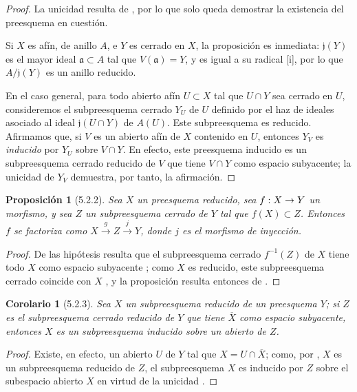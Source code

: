 \documentclass[oneside]{amsart}
\theoremstyle{ega-env-style}
\theoremstyle{ega-thm-env-style}
\newtheorem*{proposition}{Proposición}
\newtheorem*{corollary}{Corolario}
\theoremstyle{ega-defn-env-style}
\renewcommand{\to}{\mathchoice{\longrightarrow}{\rightarrow}{\rightarrow}{\rightarrow}}
\newcommand{\oldpage}[2][]{{\marginnote{\normalfont{\textbf{#1}~|~#2}}}\ignorespaces}
\let\EGAOriginalLabel\label
\renewcommand{\label}[1]{\phantomsection\EGAOriginalLabel{#1}}
\begin{document}
\begin{proof}
La unicidad resulta de , por lo que solo queda demostrar la existencia del preesquema en cuestión.

Si $X$ es afín, de anillo $A$, e $Y$ es cerrado en $X$, la proposición es inmediata:
$\mathfrak{j}(Y)$ es el mayor ideal $\mathfrak{a}\subset A$ tal que $V(\mathfrak{a})=Y$, y es igual a su radical [i], por lo que $A/\mathfrak{j}(Y)$ es un anillo reducido.

En el caso general, para todo abierto afín $U\subset X$ tal que $U\cap Y$ sea cerrado en $U$, consideremos el subpreesquema cerrado $Y_U$ de $U$ definido por el haz de ideales asociado al ideal $\mathfrak{j}(U\cap Y)$ de $A(U)$.
Este subpreesquema es reducido.
Afirmamos que, si $V$ es un abierto afín de $X$ contenido en $U$, entonces $Y_V$ es \emph{inducido} por $Y_U$ sobre $V\cap Y$.
En efecto, este preesquema inducido es un subpreesquema cerrado reducido de $V$ que tiene $V\cap Y$ como espacio subyacente;
la unicidad de $Y_V$ demuestra, por tanto, la afirmación.
\end{proof}

\begin{proposition}[5.2.2]
\label{I.5.2.2}
Sea $X$ un preesquema reducido, sea $f:X\to Y$ un morfismo, y sea $Z$ un subpreesquema cerrado de $Y$ tal que $f(X)\subset Z$.
Entonces $f$ se factoriza como $X\xrightarrow{g}Z\xrightarrow{j}Y$, donde $j$ es el morfismo de inyección.
\end{proposition}

\begin{proof}
De las hipótesis resulta que el subpreesquema cerrado $f^{-1}(Z)$ de $X$ tiene todo $X$ como espacio subyacente ;
como $X$ es reducido, este subpreesquema cerrado coincide con $X$ , y la proposición resulta entonces de .
\end{proof}

\begin{corollary}[5.2.3]
\label{I.5.2.3}
Sea $X$ un subpreesquema reducido de un preesquema $Y$; si $Z$ es el subpreesquema cerrado reducido de $Y$ que tiene $\overline{X}$ como espacio subyacente, entonces $X$ es un subpreesquema inducido sobre un abierto de $Z$.
\end{corollary}

\begin{proof}
\oldpage[I]{132}
Existe, en efecto, un abierto $U$ de $Y$ tal que $X=U\cap\overline{X}$;
como, por , $X$ es un subpreesquema reducido de $Z$, el subpreesquema $X$ es inducido por $Z$ sobre el subespacio abierto $X$ en virtud de la unicidad .
\end{proof}
\end{document}
